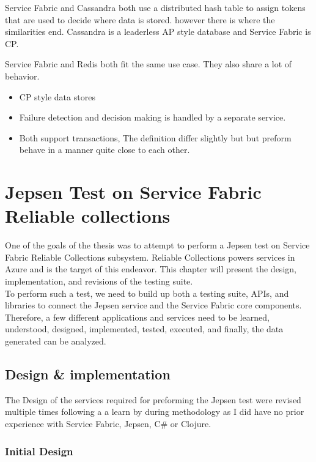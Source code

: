 \documentclass[a4paper,10pt,titlepage]{report}
\begin{document}
Service Fabric and Cassandra both use a distributed hash table to assign tokens that are used to decide where data is stored. however there is where the similarities end. Cassandra is a leaderless AP style database and Service Fabric is CP.

Service Fabric and Redis both fit the same use case. They also share a lot of behavior.
\begin{itemize}
    \item CP style data stores
    \item Failure detection and decision making is handled by a separate service.
    \item Both support transactions, The definition differ slightly but but preform behave in a manner quite close to each other.
\end{itemize}



    \chapter{Jepsen Test on Service Fabric Reliable collections}

    One of the goals of the thesis was to attempt to perform a Jepsen test on Service Fabric Reliable Collections subsystem. Reliable Collections powers services in Azure and is the target of this endeavor. 
    This chapter will present the design, implementation, and revisions of the testing suite. \\
    \vspace{5mm}
    To perform such a test, we need to build up both a testing suite, APIs, and libraries to connect the Jepsen service and the Service Fabric core components. Therefore, a few different applications and services need to be learned, understood, designed, implemented, tested, executed, and finally, the data generated can be analyzed.
    

    \section{Design \& implementation}
    The Design of the services required for preforming the Jepsen test were revised multiple times following a a learn by during methodology as I did have no prior experience with Service Fabric, Jepsen, C\# or Clojure. 

    \subsection{Initial Design}
\end{document}
